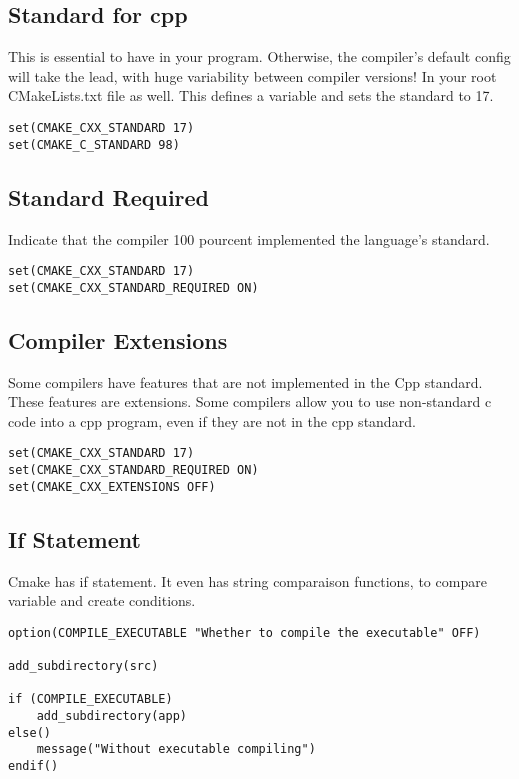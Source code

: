 \subsection{Standard for cpp}

This is essential to have in your program. Otherwise, the compiler's default config will take the lead, with huge
variability between compiler versions!
In your root CMakeLists.txt file as well. This defines a variable and sets the standard to 17.

\begin{verbatim}
set(CMAKE_CXX_STANDARD 17)
set(CMAKE_C_STANDARD 98)
\end{verbatim}

\subsection{Standard Required}

Indicate that the compiler 100 pourcent implemented the language's standard.

\begin{verbatim}
set(CMAKE_CXX_STANDARD 17)
set(CMAKE_CXX_STANDARD_REQUIRED ON)
\end{verbatim}

\subsection{Compiler Extensions}

Some compilers have features that are not implemented in the Cpp standard. These features are extensions.
Some compilers allow you to use non-standard c code into a cpp program, even if they are not in the cpp standard.

\begin{verbatim}
set(CMAKE_CXX_STANDARD 17)
set(CMAKE_CXX_STANDARD_REQUIRED ON)
set(CMAKE_CXX_EXTENSIONS OFF)
\end{verbatim}

\subsection{If Statement}

Cmake has if statement. It even has string comparaison functions, to compare variable and create conditions.

\begin{verbatim}
option(COMPILE_EXECUTABLE "Whether to compile the executable" OFF)

add_subdirectory(src)

if (COMPILE_EXECUTABLE)
    add_subdirectory(app)
else()
    message("Without executable compiling")
endif()



\end{verbatim}


